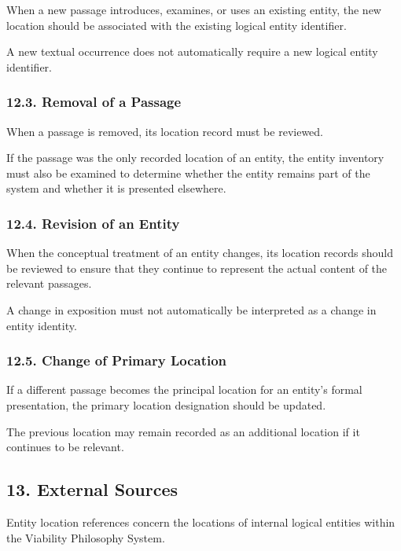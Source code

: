 When a new passage introduces,
examines, or uses an existing
entity, the new location
should be associated with
the existing logical entity
identifier.

A new textual occurrence
does not automatically
require a new logical
entity identifier.

\subsubsection*{12.3. Removal of a Passage}

When a passage is removed,
its location record must
be reviewed.

If the passage was the
only recorded location
of an entity, the entity
inventory must also be
examined to determine
whether the entity remains
part of the system and
whether it is presented
elsewhere.

\subsubsection*{12.4. Revision of an Entity}

When the conceptual treatment
of an entity changes, its
location records should
be reviewed to ensure
that they continue to
represent the actual
content of the relevant
passages.

A change in exposition
must not automatically
be interpreted as a change
in entity identity.

\subsubsection*{12.5. Change of Primary Location}

If a different passage
becomes the principal
location for an entity's
formal presentation,
the primary location
designation should be
updated.

The previous location
may remain recorded
as an additional location
if it continues to be
relevant.


\subsection*{13. External Sources}

Entity location references
concern the locations of
internal logical entities
within the Viability
Philosophy System.

